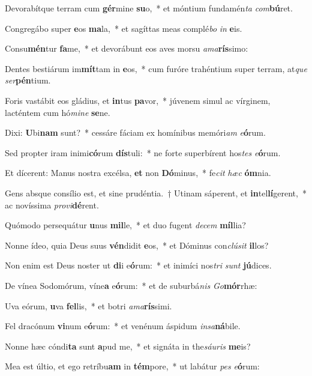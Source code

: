 \item Devorabítque terram cum \textbf{gér}mine \textbf{su}o,~* et móntium fundamén\textit{ta} \textit{com}\textbf{bú}ret.
\item Congregábo super \textbf{e}os \textbf{ma}la,~* et sagíttas meas complé\textit{bo} \textit{in} \textbf{e}is.
\item Consu\textbf{mén}tur \textbf{fa}me,~* et devorábunt eos aves morsu \textit{a}\textit{ma}\textbf{rís}simo:
\item Dentes bestiárum im\textbf{mít}tam in \textbf{e}os,~* cum furóre trahéntium super terram, at\textit{que} \textit{ser}\textbf{pén}tium.
\item Foris vastábit eos gládius, et \textbf{in}tus \textbf{pa}vor,~* júvenem simul ac vírginem, lacténtem cum hó\textit{mi}\textit{ne} \textbf{se}ne.
\item Dixi: \textbf{U}bi\textbf{nam} sunt?~* cessáre fáciam ex homínibus memóri\textit{am} \textit{e}\textbf{ó}rum.
\item Sed propter iram inimi\textbf{có}rum \textbf{dís}tuli:~* ne forte superbírent hos\textit{tes} \textit{e}\textbf{ó}rum.
\item Et dícerent: Manus nostra excélsa, \textbf{et} non \textbf{Dó}minus,~* fe\textit{cit} \textit{hæc} \textbf{óm}nia.
\item Gens absque consílio est, et sine prudéntia.~† Utinam sáperent, et \textbf{in}tel\textbf{lí}gerent,~* ac novíssima \textit{pro}\textit{vi}\textbf{dé}rent.
\item Quómodo persequátur \textbf{u}nus \textbf{mil}le,~* et duo fugent \textit{de}\textit{cem} \textbf{míl}lia?
\item Nonne ídeo, quia Deus suus \textbf{vén}didit \textbf{e}os,~* et Dóminus con\textit{clú}\textit{sit} \textbf{il}los?
\item Non enim est Deus noster ut \textbf{di}i e\textbf{ó}rum:~* et inimíci nos\textit{tri} \textit{sunt} \textbf{jú}dices.
\item De vínea Sodomórum, víne\textbf{a} e\textbf{ó}rum:~* et de suburbá\textit{nis} \textit{Go}\textbf{mór}rhæ:
\item Uva eórum, \textbf{u}va \textbf{fel}lis,~* et botri \textit{a}\textit{ma}\textbf{rís}simi.
\item Fel dracónum \textbf{vi}num e\textbf{ó}rum:~* et venénum áspidum \textit{in}\textit{sa}\textbf{ná}bile.
\item Nonne hæc cóndi\textbf{ta} sunt \textbf{a}pud me,~* et signáta in the\textit{sáu}\textit{ris} \textbf{me}is?
\item Mea est últio, et ego retríbu\textbf{am} in \textbf{tém}pore,~* ut labátur \textit{pes} \textit{e}\textbf{ó}rum:
